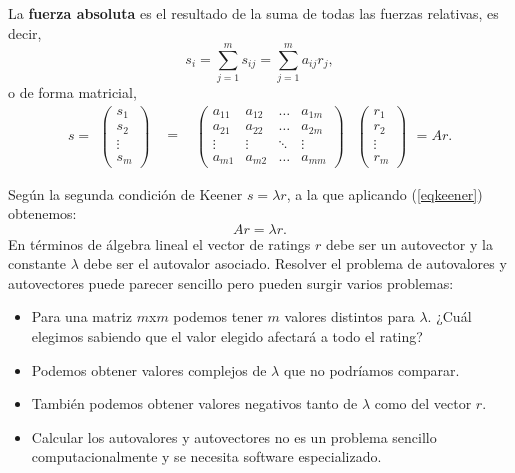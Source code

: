 \begin{defi} 
	La \textbf{fuerza absoluta} es el resultado de la suma de todas las fuerzas relativas, es decir,
	\begin{equation}
		s_{i}=\sum_{j=1}^{m} s_{ij} = \sum_{j=1}^{m} a_{ij}r_{j}, 
	\end{equation}
	o de forma matricial,
	\begin{equation}
		s=
		\begin{array}{ccccccc}
			\left(\begin{array}{c}
				s_{1}\\
				s_{2}\\
				\vdots\\
				s_{m}	
			\end{array}\right) & \begin{array}{c}
			=
		\end{array} & \left(\begin{array}{cccc}
		a_{11} & a_{12} & \dots & a_{1m}\\
		a_{21} & a_{22} & \dots & a_{2m} \\
		\vdots & \vdots & \ddots & \vdots\\
		a_{m1} & a_{m2} & \dots & a_{mm}
	\end{array} \right) & \left(\begin{array}{c}
	r_{1}\\
	r_{2}\\
	\vdots\\
	r_{m}
	\end{array} \right) 
	\end{array}  
	=Ar. \label{eqkeener}
	\end{equation} 
\end{defi}

Según la segunda condición de Keener $s= \lambda r$, a la que aplicando (\ref{eqkeener}) obtenemos:
\begin{equation} \label{eqkeener2}
Ar= \lambda r.
\end{equation}
En términos de álgebra lineal el vector de ratings $r$ debe ser un autovector y la constante $\lambda$ debe ser el autovalor asociado. Resolver el problema de autovalores y autovectores puede parecer sencillo pero pueden surgir varios problemas:
\begin{itemize}
	\item Para una matriz $m$x$m$ podemos tener $m$ valores distintos para $\lambda$. ¿Cuál elegimos sabiendo que el valor elegido afectará a todo el rating?
	\item Podemos obtener valores complejos de $\lambda$ que no podríamos comparar.
	\item También podemos obtener valores negativos tanto de $\lambda$ como del vector $r$.
	\item Calcular los autovalores y autovectores no es un problema sencillo computacionalmente y se necesita software especializado.
\end{itemize}


